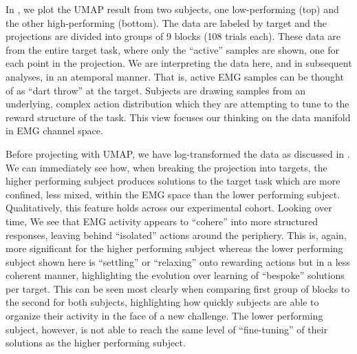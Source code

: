 \documentclass[../main.tex]{subfiles}
\begin{document}




In , we plot the UMAP result from two subjects, one low-performing (top) and the other high-performing (bottom). The data are labeled by target and the projections are divided into groups of 9 blocks (108 trials each). These data are from the entire target task, where only the ``active'' samples are shown, one for each point in the projection. We are interpreting the data here, and in subsequent analyses, in an atemporal manner. That is, active EMG samples can be thought of as ``dart throw'' at the target. Subjects are drawing samples from an underlying, complex action distribution which they are attempting to tune to the reward structure of the task. This view focuses our thinking on the data manifold in EMG channel space.

Before projecting with UMAP, we have log-transformed the data as discussed in . We can immediately see how, when breaking the projection into targets, the higher performing subject produces solutions to the target task which are more confined, less mixed, within the EMG space than the lower performing subject. Qualitatively, this feature holds across our experimental cohort. Looking over time, We see that EMG activity appears to ``cohere'' into more structured responses, leaving behind ``isolated'' actions around the periphery. This is, again, more significant for the higher performing subject whereas the lower performing subject shown here is ``settling'' or ``relaxing'' onto rewarding actions but in a less coherent manner, highlighting the evolution over learning of ``bespoke'' solutions per target. This can be seen most clearly when comparing first group of blocks to the second for both subjects, highlighting how quickly subjects are able to organize their activity in the face of a new challenge. The lower performing subject, however, is not able to reach the same level of ``fine-tuning'' of their solutions as the higher performing subject.
\end{document}

